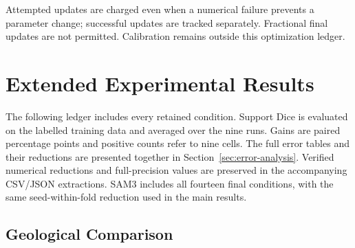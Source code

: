 Attempted updates are charged even when a numerical failure prevents
a parameter change; successful updates are tracked separately.
Fractional final updates are not permitted. Calibration remains
outside this optimization ledger.

\clearpage

\section{Extended Experimental Results}
\label{sec:extended-results}

The following ledger includes every retained condition. Support Dice is
evaluated on the labelled training data and averaged over the nine runs. Gains
are paired percentage points and positive counts refer to nine cells.
The full error tables and their reductions are presented together in
Section~\ref{sec:error-analysis}. Verified numerical reductions and
full-precision values are preserved in the accompanying CSV/JSON
extractions. SAM3 includes all fourteen final conditions, with the
same seed-within-fold reduction used in the main results.

\subsection{Geological Comparison}

